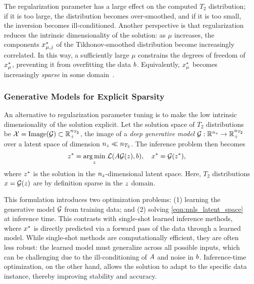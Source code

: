 The regularization parameter has a large effect on the computed $T_2$ distribution;
if it is too large, the distribution becomes over-smoothed, and if it is too small, the inversion becomes ill-conditioned.
Another perspective is that regularization reduces the intrinsic dimensionality of the solution: as $\mu$ increases, the components $x^*_{\mu,j}$ of the Tikhonov-smoothed distribution become increasingly correlated.
In this way, a sufficiently large $\mu$ constrains the degrees of freedom of $x^*_{\mu}$, preventing it from overfitting the data $b$.
Equivalently, $x^*_{\mu}$ becomes increasingly \textit{sparse} in some domain~\citep{donoho_compressed_2006,candes_stable_2006}.

\subsubsection{Generative Models for Explicit Sparsity}\label{subsec:generative_models}

An alternative to regularization parameter tuning is to make the low intrinsic dimensionality of the solution explicit.
Let the solution space of $T_2$ distributions be $\mathcal{X} = \operatorname{Image}(\mathcal{G}) \subset \mathbb{R}_+^{n_{T_2}}$, the image of a \textit{deep generative model} $\mathcal{G} : \mathbb{R}^{n_{z}} \to \mathbb{R}_+^{n_{T_2}}$ over a latent space of dimension $n_{z} \ll n_{T_2}$.
The inference problem then becomes
\begin{align}\label{eqn:nnls_latent_space}
    z^* = \underset{z}{\operatorname{arg\,min}} \; \mathcal{L}(A \mathcal{G}(z), b), \quad x^* = \mathcal{G}(z^*),
\end{align}
where $z^*$ is the solution in the $n_{z}$-dimensional latent space.
Here, $T_2$ distributions $x = \mathcal{G}(z)$ are by definition sparse in the $z$ domain.

This formulation introduces two optimization problems:
(1) learning the generative model $\mathcal{G}$ from training data; and
(2) solving \eqref{eqn:nnls_latent_space} at inference time.
This contrasts with single-shot learned inference methods, where $x^*$ is directly predicted via a forward pass of the data through a learned model.
While single-shot methods are computationally efficient, they are often less robust: the learned model must generalize across all possible inputs, which can be challenging due to the ill-conditioning of $A$ and noise in $b$.
Inference-time optimization, on the other hand, allows the solution to adapt to the specific data instance, thereby improving stability and accuracy.

